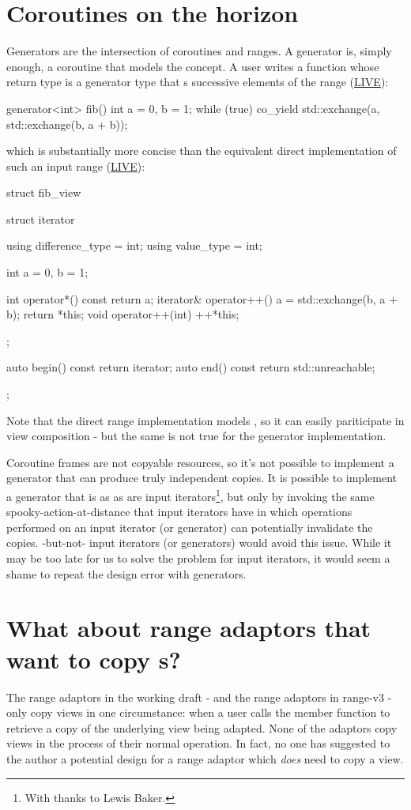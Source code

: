 \section{Coroutines on the horizon}

Generators are the intersection of coroutines and ranges. A generator is, simply
enough, a coroutine that models the  concept. A user writes a
function whose return type is a generator type that s
successive elements of the range
(\href{https://wandbox.org/permlink/OjvfCc8L3pYMNdU9}{LIVE}):
\begin{codeblock}
generator<int> fib() {
  int a = 0, b = 1;
  while (true)
    co_yield std::exchange(a, std::exchange(b, a + b));
}
\end{codeblock}
which is substantially more concise than the equivalent direct implementation of
such an input range
(\href{https://wandbox.org/permlink/tlqfMsvXuoz4hSy4}{LIVE}):
\begin{codeblock}
struct fib_view {
  struct iterator {
    using difference_type = int;
    using value_type = int;

    int a = 0, b = 1;

    int operator*() const { return a; }
    iterator& operator++() {
      a = std::exchange(b, a + b);
      return *this;
    }
    void operator++(int) { ++*this; }
  };

  auto begin() const { return iterator{}; }
  auto end() const { return std::unreachable; }
};
\end{codeblock}
Note that the direct range implementation models , so it can easily
pariticipate in view composition - but the same is not true for the generator
implementation.

Coroutine frames are not copyable resources, so it's not possible to implement a
generator that can produce truly independent copies. It is possible to implement
a generator that is as  as are input
iterators\footnote{With thanks to Lewis Baker.}, but only by invoking the same
spooky-action-at-distance that input iterators have in which operations
performed on an input iterator (or generator) can potentially invalidate the
copies. -but-not- input iterators (or generators)
would avoid this issue. While it may be too late for us to solve the problem for
input iterators, it would seem a shame to repeat the design error with
generators.

\section{What about range adaptors that want to copy s?}
The range adaptors in the working draft - and the range adaptors in range-v3 -
only copy views in one circumstance: when a user calls the 
member function to retrieve a copy of the underlying view being adapted. None of
the adaptors copy views in the process of their normal operation. In fact, no
one has suggested to the author a potential design for a range adaptor which
\emph{does} need to copy a view.

